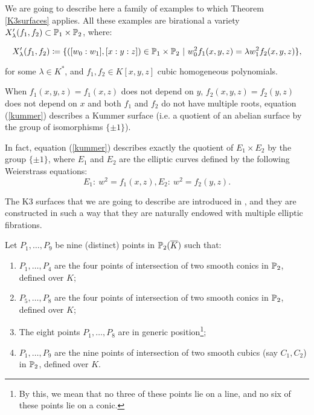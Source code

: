 \documentclass[a4paper,12pt]{article}
\begin{document}
We are going to describe here a family of examples to which Theorem \ref{K3surfaces} applies. All these examples are birational a variety $X'_{\lambda}(f_1,f_2)\subset \P_1\times \P_2$, where:

\begin{equation}\label{kummer}
	X'_{\lambda}(f_1,f_2)\defeq\{([w_0:w_1],[x:y:z])\in \P_1\times \P_2\ | \ w_0^2f_1(x,y,z)=\lambda w_1^2f_2(x,y,z)\},
\end{equation}

 for some $\lambda \in K^*$, and $f_1,f_2 \in K[x,y,z]$ cubic homogeneous polynomials.
 
 \smallskip
 
 
\begin{remark}\label{casoparticolarekummer}
	When $f_1(x,y,z)=f_1(x,z)$ does not depend on $y$, $f_2(x,y,z)=f_2(y,z)$ does not depend on $x$ and both $f_1$ and $f_2$ do not have multiple roots, equation (\ref{kummer}) describes a Kummer surface (i.e. a quotient of an abelian surface by the group of isomorphisms $\{\pm 1\}$).
	
	In fact, equation (\ref{kummer}) describes exactly the quotient of $E_1 \times E_2$ by the group $\{\pm 1\}$, where $E_1$ and $E_2$ are the elliptic curves defined by the following Weierstrass equations:
	\begin{equation}\label{ellittichechecopronolakummer}
	E_1: \ w^2=f_1(x,z),
	E_2: \ w^2=f_2(y,z).
	\end{equation} 
\end{remark}


\smallskip


The K3 surfaces that we are going to describe are introduced in \cite{garbagnati}, and they are constructed in such a way that they are naturally endowed with multiple elliptic fibrations.

Let $P_1,\dots ,P_9$ be nine (distinct) points in $\P_2(\overline{K})$ such that:
\begin{enumerate}
	\item $P_1,\dots, P_4$ are the four points of intersection of two smooth conics in $\P_2$, defined over $K$;
	\item $P_5,\dots, P_8$ are the four points of intersection of two smooth conics in $\P_2$, defined over $K$;
	\item The eight points $P_1,\dots, P_8$ are in generic position\footnote{\label{genericpoints}By this, we mean that no three of these points lie on a line, and no six of these points lie on a conic.};
	\item $P_1, \dots, P_9$ are the nine points of intersection of two smooth cubics (say $C_1,C_2$) in $\P_2$, defined over $K$.
\end{enumerate}
\end{document}
